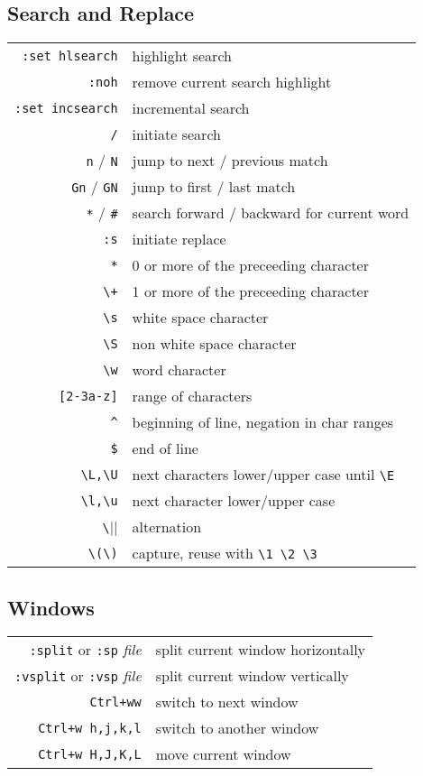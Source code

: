 \begin{multicols*}{3}
\subsection*{Search and Replace}
\begin{tabular}{@{}rl@{}}
\verb|:set hlsearch| & highlight search \\
\verb|:noh|      & remove current search highlight \\
\verb|:set incsearch| & incremental search \\
\verb|/|        & initiate search \\
\verb|n| / \verb|N| & jump to next / previous match \\
\verb|Gn| / \verb|GN| & jump to first / last match \\
\verb|*| / \verb|#| & search forward / backward for current word \\
\verb|:s|       & initiate replace \\
\verb|*|        & 0 or more of the preceeding character \\
\verb|\+|       & 1 or more of the preceeding character \\
\verb|\s|       & white space character \\
\verb|\S|       & non white space character \\
\verb|\w|       & word character \\
\verb|[2-3a-z]| & range of characters \\
\verb|^|        & beginning of line, negation in char ranges \\
\verb|$|        & end of line \\
\verb|\L,\U|    & next characters lower/upper case until \verb|\E| \\
\verb|\l,\u|    & next character lower/upper case \\
\verb|\||       & alternation \\
\verb|\(\)|     & capture, reuse with \verb|\1 \2 \3|
\end{tabular}

\subsection*{Windows}
\begin{tabular}{@{}rl@{}}
\verb|:split| or \verb|:sp| \itshape{file} & split current window horizontally \\
\verb|:vsplit| or \verb|:vsp| \itshape{file} & split current window vertically \\
\verb|Ctrl+ww| & switch to next window \\
\verb|Ctrl+w h,j,k,l| & switch to another window \\
\verb|Ctrl+w H,J,K,L| & move current window
\end{tabular}


\end{multicols*}
